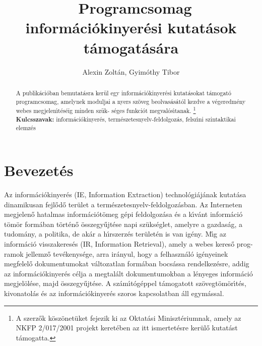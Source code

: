 \documentclass{llncs}
\begin{document}
\pagestyle{myheadings}
\def\leftmark{{\rm IV. Magyar Sz\'am\'\i t\'og\'epes Nyelv\'eszeti Konferencia}}
\def\rightmark{{\rm Szeged, d·tum}}

\setcounter{page}{3}

\title{\ \break Programcsomag inform\'aci\'okinyer\'esi\break
kutat\'asok t\'amogat\'as\'ara}
\author{Alexin Zolt\'an, Gyim\'othy Tibor}

\maketitle

\begin{abstract}
A publik\'aci\'oban bemutat\'asra ker\"ul egy inform\'aci\'okinyer\'esi
kutat\'asokat t\'amogat\'o programcsomag, amelynek moduljai a
nyers sz\"oveg beolvas\'as\'at\'ol kezdve a v\'egeredm\'eny
webes megjelen\'\i t\'es\'eig minden sz\"uk- s\'eges funkci\'ot
megval\'os\'\i tanak.
\footnote{A szerz\H{o}k k\"osz\"onet\"uket fejezik ki az Oktat\'asi
Miniszt\'eriumnak, amely az NKFP 2/017/2001 projekt keret\'eben az itt
ismertet\'esre ker\"ul\H{o} kutat\'ast t\'amogatta.}
\\[2mm]
{\bf Kulcsszavak:} inform\'aci\'okinyer\'es, term\'eszetesnyelv-feldolgoz\'as,
felsz\'\i ni szintaktikai elemz\'es
\end{abstract}

%
\section{Bevezet\'es}
%
Az inform\'aci\'okinyer\'es (IE, Information Extraction) technol\'ogi\'aj\'anak
kutat\'asa dinamikusan fejl\H{o}d\H{o} ter\"ulet a term\'eszetesnyelv-feldolgoz\'asban.
Az Interneten megjelen\H{o} hatalmas inform\'aci\'ot\"omeg g\'epi feldolgoz\'asa \'es a
k\'\i v\'ant inform\'aci\'o t\"om\"or form\'aban t\"ort\'en\H{o} \"osszegy\H{u}jt\'ese
napi sz\"uks\'eglet, amelyre a gazdas\'ag, a tudom\'any, a politika, de ak\'ar a
h\'\i rszerz\'es ter\"ulet\'en is van ig\'eny. M\'\i g az inform\'aci\'o visszakeres\'es
(IR, Information Retrieval), amely a webes keres\H{o} prog- ramok jellemz\H{o}
tev\'ekenys\'ege, arra ir\'anyul, hogy a felhaszn\'al\'o ig\'enyeinek megfelel\H{o}
dokumentumokat v\'altozatlan form\'aban bocs\'assa rendelkez\'esre, addig
az inform\'aci\'okinyer\'es c\'elja a megtal\'alt dokumentumokban a l\'enyeges
inform\'aci\'o megjel\"ol\'ese, majd \"osszegy\H{u}jt\'ese. A sz\'am\'\i t\'og\'eppel
t\'amogatott sz\"ovegt\"om\"or\'\i t\'es, kivonatol\'as \'es az inform\'aci\'okinyer\'es
szoros kapcsolatban \'all egym\'assal.
\end{document}
